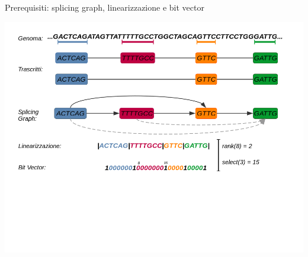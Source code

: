\documentclass{beamer}
\begin{document}
\begin{tframe}{Prerequisiti: splicing graph, linearizzazione e bit vector}

    
  \begin{center}
     \includegraphics[scale = 0.31]{img/linear8.png}
  \end{center}
\end{tframe}
\end{document}
